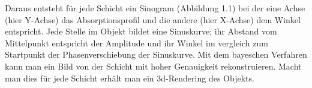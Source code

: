 \documentclass[]{dsadokumentation}
\begin{document}
Daraus entsteht für jede Schicht ein Sinogram (Abbildung 1.1) bei der eine Achse (hier Y-Achse) das Absorptionsprofil und die andere (hier X-Achse) dem Winkel entspricht. Jede Stelle im Objekt bildet eine Sinuskurve; ihr Abstand vom Mittelpunkt entspricht der Amplitude und ihr Winkel im vergleich zum Startpunkt der Phasenverschiebung der Sinuskurve. Mit dem bayeschen Verfahren  kann man ein Bild von der Schicht mit hoher Genauigkeit rekonstruieren. Macht man dies für jede Schicht erhält man ein 3d-Rendering des Objekts.

\printbibliography{}
\end{document}
